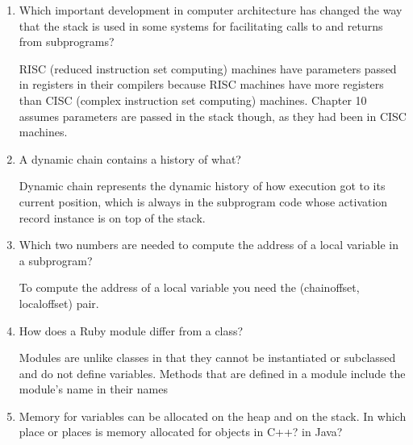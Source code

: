 \begin{enumerate}
  \item Which important development in computer architecture
    has changed the way that the stack is used in some
    systems for facilitating calls to and returns from
    subprograms?
    
    \begin{answer}
    RISC (reduced instruction set computing) machines have parameters passed in registers in their compilers because RISC machines have more registers than CISC (complex instruction set computing) machines. Chapter 10 assumes parameters are passed in the stack though, as they had been in CISC machines.

    \end{answer}

  \item A dynamic chain contains a history of what?
  
  \begin{answer}
  Dynamic chain represents the dynamic history of how execution got to its current position, which is always in the subprogram code whose activation record instance is on top of the stack.
  \end{answer}

  \item Which two numbers are needed to compute
    the address of a local variable in a subprogram?
    
    \begin{answer}
    
    To compute the address of a local variable you need the (chain\textunderscore offset, local\textunderscore offset) pair.

    \end{answer}

  \item How does a Ruby module differ from a class?
  
  \begin{answer}
  
  Modules are unlike classes in that they cannot be instantiated or subclassed and do not define variables. Methods that are defined in a module include the  module’s name in their names
  
  \end{answer}

  \item Memory for variables can be allocated on the heap
    and on the stack. In which place or places is memory
    allocated for objects in C++? in Java?
    

\end{enumerate}
